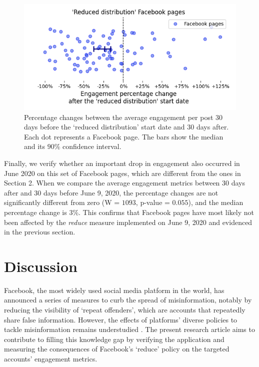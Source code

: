 \documentclass[11pt,a4paper]{article}
\begin{document}
\begin{figure}[!h]
\centering
\includegraphics[width=\linewidth]{./../figure/reduce_percentage_change.png}
\caption{Percentage changes between the average engagement per post 30 days before the `reduced distribution' start date and 30 days after. Each dot represents a Facebook page. The bars show the median and its $90\%$ confidence interval.}
\label{reduce_percentage_change}
\end{figure}
 
Finally, we verify whether an important drop in engagement also occurred in June 2020 on this set of Facebook pages, which are different from the ones in Section 2.
When we compare the average engagement metrics between 30 days after and 30 days before June 9, 2020, the percentage changes are not significantly different from zero (W = $1093$, p-value = $0.055$), and the median percentage change is $3\%$.
This confirms that Facebook pages have most likely not been affected by the {\it reduce} measure implemented on June 9, 2020 and evidenced in the previous section.

\section{Discussion}

Facebook, the most widely used social media platform in the world, has announced a series of measures to curb the spread of misinformation, notably by reducing the visibility of `repeat offenders', which are accounts that repeatedly share false information. 
However, the effects of platforms' diverse policies to tackle misinformation remains understudied \citep{pasquetto2020tackling}. 
The present research article aims to contribute to filling this knowledge gap by verifying the application and measuring the consequences of Facebook's `reduce' policy on the targeted accounts' engagement metrics.
\end{document}
